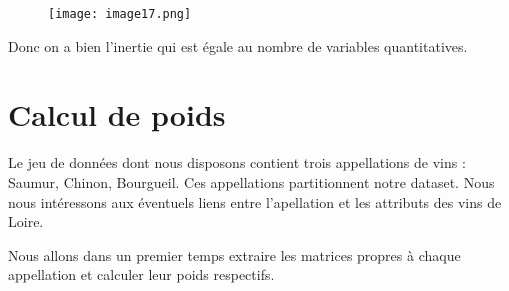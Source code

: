 \documentclass{article}
\begin{document}
\begin{figure}[H]
    \centering
    \texttt{[image: image17.png]}
    \label{fig:enter-label}
\end{figure}

Donc on a bien l'inertie qui est égale au nombre de variables quantitatives.

\section{Calcul de poids}

Le jeu de données dont nous disposons contient trois appellations de vins : Saumur, Chinon, Bourgueil. Ces appellations partitionnent notre dataset. Nous nous intéressons aux éventuels liens entre l'apellation et les attributs des vins de Loire.

Nous allons dans un premier temps extraire les matrices propres à chaque appellation et calculer leur poids respectifs.
\end{document}
